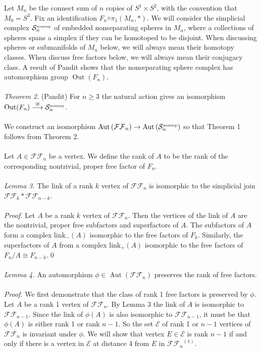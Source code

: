 \documentclass[11pt]{article}
\newcommand{\Aut}[1]{\ensuremath{ \aaut \left (#1 \right ) }}
\newcommand{\outn}{{\ensuremath{ \oout(F_n)}} }
\newcommand{\nosep}{{\ensuremath{ \mathcal S^{\mbox{\tiny{nonsep}}}_n }}}
\newcommand{\ffn}{{\ensuremath{ \mathcal {FF}_n }}}
\DeclareMathOperator{\oout}{Out}
\DeclareMathOperator{\aaut}{Aut}
\begin{document}
Let $M_{n}$ be the connect sum of $n$ copies of  $S^1 \times S^2$, with the convention that $M_0 =S^3$.
Fix an identification $F_n \stackrel{\cong}{} \pi_1(M_n,\ast)$.
We will consider the simplicial complex $\nosep$ of embedded nonseparating spheres in $M_n$, where a collections of spheres spans a simplex if they can be homotoped to be disjoint. 
When discussing spheres or submanifolds of $M_n$ below, we will always mean their homotopy classes.
When discuss free factors below, we will always mean their conjugacy class.
A result of Pandit \cite{pandit} shows that the nonseparating sphere complex has automorphism group $\oout(F_n)$.\\
\\
\emph{Theorem 2.} (Pandit) For $n \geq 3$ the natural action gives an isomorphism $ \outn \stackrel{\cong}{\longrightarrow} \nosep$.\\
\\
We construct an isomorphism $\Aut{\ffn} \to \Aut{\nosep}$ so that Theorem 1 follows from Theorem 2.\\
\\
Let $A \in \ffn$ be a vertex. We define the rank of $A$ to be the rank of the corresponding nontrivial, proper free factor of $F_n$.\\
\\
\noindent \emph{Lemma 3.} The link of a rank $k$ vertex of $\ffn$ is isomorphic to the simplicial join $\mathcal{FF}_{k} \ast \mathcal{FF}_{n-k}$.\\
\\
\noindent \emph{Proof.}
Let $A$ be a rank $k$ vertex of $\ffn$.
Then the vertices of the link of $A$ are the nontrivial, proper free subfactors and superfactors of $A$.
The subfactors of $A$ form a complex $\mbox{link}_-(A)$ isomorphic to the free factors of $F_k$.
Similarly, the superfactors of $A$ from a complex $\mbox{link}_+ (A)$ isomorphic to the free factors of $F_n/A \cong F_{n-k}$.\qed \\
\\

\noindent \emph{Lemma 4.} An automorphism $\phi \in \Aut \ffn$ preserves the rank of free factors.\\
\\
\noindent \emph{Proof.}
We first demonstrate that the class of rank 1 free factors is preserved by $\phi$.
Let $A$ be a rank 1 vertex of $\ffn$.
By Lemma 3 the link of $A$ is isomorphic to $\mathcal{FF}_{n-1}$.
Since the link of $\phi(A)$ is also isomorphic to $\mathcal{FF}_{n-1}$, it must be that $\phi(A)$ is either rank 1 or rank $n-1$.
So the set $\mathcal E$ of rank 1 or $n-1$ vertices of $\ffn$ is invariant under $\phi$.
We will show that vertex $E \in \mathcal E$ is rank $n-1$ if and only if there is a vertex in $\mathcal E$ at distance 4 from $E$ in $\ffn^{(1)}$.
\end{document}
